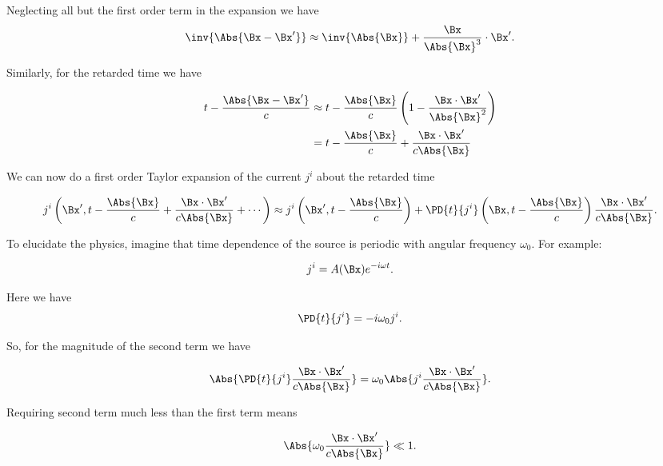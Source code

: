 Neglecting all but the first order term in the expansion we have
\begin{equation}\label{eqn:relativisticElectrodynamicsL20:30}
\inv{\Abs{\Bx - \Bx'}}
\approx 
\inv{\Abs{\Bx}} + \frac{\Bx}{\Abs{\Bx}^3} \cdot \Bx' .
\end{equation}

Similarly, for the retarded time we have

\begin{align*}
t - \frac{\Abs{\Bx - \Bx'}}{c} 
&\approx t - \frac{\Abs{\Bx}}{c} \left( 1 - \frac{\Bx \cdot \Bx'}{\Abs{\Bx}^2} \right) \\
&= t - \frac{\Abs{\Bx}}{c} + \frac{\Bx \cdot \Bx'}{c \Abs{\Bx}}
\end{align*}

We can now do a first order Taylor expansion of the current $j^i$ about the retarded time

\begin{equation}\label{eqn:relativisticElectrodynamicsL20:50}
j^i\left(\Bx', t - \frac{\Abs{\Bx}}{c} + \frac{\Bx \cdot \Bx'}{c \Abs{\Bx}} + \cdots \right)
\approx
j^i\left(\Bx', t - \frac{\Abs{\Bx}}{c}\right) + \PD{t}{j^i} \left(\Bx, t - \frac{\Abs{\Bx}}{c}\right) \frac{\Bx \cdot \Bx'}{c \Abs{\Bx}}.
\end{equation}

To elucidate the physics, imagine that time dependence of the source is periodic with angular frequency $\omega_0$.  For example:

\begin{equation}\label{eqn:relativisticElectrodynamicsL20:n}
j^i = A(\Bx) e^{-i \omega t}.
\end{equation}

Here we have
\begin{equation}\label{eqn:relativisticElectrodynamicsL20:70}
\PD{t}{j^i} = -i \omega_0 j^i.
\end{equation}

So, for the magnitude of the second term we have

\begin{equation}\label{eqn:relativisticElectrodynamicsL20:90}
\Abs{\PD{t}{j^i} \frac{\Bx \cdot \Bx'}{c \Abs{\Bx}}} = \omega_0 \Abs{j^i \frac{\Bx \cdot \Bx'}{c \Abs{\Bx}}}.
\end{equation}

Requiring second term much less than the first term means 

\begin{equation}\label{eqn:relativisticElectrodynamicsL20:110}
\Abs{\omega_0 \frac{\Bx \cdot \Bx'}{c \Abs{\Bx}}} \ll 1.
\end{equation}


